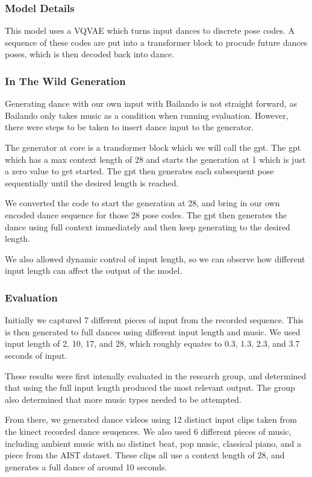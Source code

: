 \documentclass[final,5p,times,authoryear]{article}
\begin{document}
\subsubsection{Model Details}
This model uses a VQVAE which turns input dances to discrete pose codes. A
sequence of these codes are put into a transformer block to procude future
dances poses, which is then decoded back into dance.

\subsubsection{In The Wild Generation}
Generating dance with our own input with Bailando is not straight forward, as
Bailando only takes music as a condition when running evaluation. However, there
were steps to be taken to insert dance input to the generator.

The generator at core is a transformer block which we will call the gpt.
The gpt which has a max context length of 28 and starts the generation at 1
which is just a zero value to get started. The gpt then generates each
subsequent pose sequentially until the desired length is reached. 

We converted the code to start the generation at 28, and bring in our own
encoded dance sequence for those 28 pose codes. The gpt then generates the dance
using full context immediately and then keep generating to the desired length.

We also allowed dynamic control of input length, so we can observe how different
input length can affect the output of the model.

\subsubsection{Evaluation}
Initially we captured 7 different pieces of input from the recorded sequence.
This is then generated to full dances using different input length and music. We
used input length of 2, 10, 17, and 28, which roughly equates to 0.3, 1.3, 2.3,
and 3.7 seconds of input.

These results were first intenally evaluated in the research group, and
determined that using the full input length produced the most relevant output.
The group also determined that more music types needed to be attempted. 

From there, we generated dance videos using 12 distinct input clips taken from the kinect
recorded dance seuqences. We also used 6 different pieces of music, including
ambient music with no distinct beat, pop music, classical piano, and a piece
from the AIST dataset. These clips all use a context length of 28, and generates
a full dance of around 10 seconds.
\end{document}

